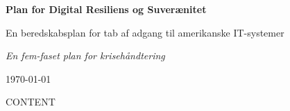 \documentclass[a4paper,11pt,oneside]{book}
\newcommand{\doctitle}{Plan for Digital Resiliens og Suverænitet}
\begin{document}
\begin{titlepage}
    \centering
    \vspace*{2cm}
    {\Huge\bfseries \doctitle\par}
    \vspace{1cm}
    {\Large En beredskabsplan for tab af adgang til amerikanske IT-systemer\par}
    \vspace{2cm}

    \vspace{2cm}
    {\Large\itshape En fem-faset plan for krisehåndtering\par}
    \vfill

    {\large \today\par}
\end{titlepage}

\frontmatter
\tableofcontents
\newpage

\mainmatter
{{CONTENT}}
\end{document}
